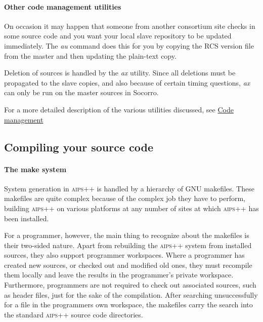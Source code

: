 \paragraph{Other code management utilities}
On occasion it may happen that someone from another consortium site checks in
some source code and you want your local slave repository to be updated
immediately.  The \textit{au} command does this for you by copying the RCS version
file from the master and then updating the plain-text copy.

Deletion of sources is handled by the \textit{ax} utility.  Since all deletions
must be propagated to the slave copies, and also because of certain timing
questions, \textit{ax} can only be run on the master sources in Socorro.

For a more detailed description of the various utilities discussed, see
\hyperref{Code management}{Code management (see AIPS++ System Manual, Section }{for more details)}{Code management}


\label{Compilation}
\subsection{Compiling your source code}

\paragraph{The make system}
System generation in \textsc{aips++} is handled by a hierarchy of GNU makefiles.
These makefiles are quite complex because of the complex job they have to
perform, building \textsc{aips++} on various platforms at any number of sites at
which \textsc{aips++} has been installed.

For a programmer, however, the main thing to recognize about the makefiles is
their two-sided nature.  Apart from rebuilding the \textsc{aips++} system from
installed sources, they also support programmer workspaces.  Where a
programmer has created new sources, or checked out and modified old ones, they
must recompile them locally and leave the results in the programmer's private
workspace.  Furthermore, programmers are not required to check out associated
sources, such as header files, just for the sake of the compilation.  After
searching unsuccessfully for a file in the programmers own workspace, the
makefiles carry the search into the standard \textsc{aips++} source code
directories.

